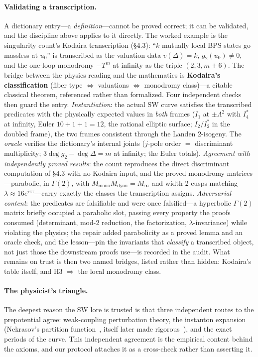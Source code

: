 \documentclass{article}
\theoremstyle{plain}
\theoremstyle{definition}
\numberwithin{equation}{section}
\begin{document}
\paragraph{Validating a transcription.} A dictionary entry---a \emph{definition}---cannot
be proved correct; it can be validated, and the discipline above applies to it directly. The
worked example is the singularity count's Kodaira transcription (\S4.3): ``$k$ mutually local
BPS states go massless at $u_0$'' is transcribed as the valuation data
$v(\Delta) = k$, $g_2(u_0) \neq 0$, and the one-loop monodromy $-T^m$ at infinity as the
triple $(2, 3, m{+}6)$. The bridge between the physics reading and the mathematics is
\textbf{Kodaira's classification} (fiber type $\Leftrightarrow$ valuations
$\Leftrightarrow$ monodromy class)---a citable classical theorem, referenced rather than
formalized. Four independent checks then guard the entry. \emph{Instantiation}: the actual SW
curve satisfies the transcribed predicates with the physically expected values in \emph{both}
frames ($I_1$ at $\pm\Lambda^2$ with $I_4^*$ at infinity, Euler $10{+}1{+}1 = 12$, the
rational elliptic surface; $I_2$/$I_2^*$ in the doubled frame), the two frames consistent
through the Landen 2-isogeny. The \emph{oracle} verifies the dictionary's internal joints
($j$-pole order $=$ discriminant multiplicity; $3\deg g_2 - \deg\Delta = m$ at infinity;
the Euler totals). \emph{Agreement with independently proved results}: the count reproduces
the direct discriminant computation of \S4.3 with no Kodaira input, and the proved monodromy
matrices---parabolic, in $\Gamma(2)$, with $M_{\mathrm{mono}}M_{\mathrm{dyon}} = M_\infty$
and width-2 cusps matching $\lambda \approx 16e^{i\pi\tau}$---carry exactly the classes
the transcription assigns. \emph{Adversarial content}: the predicates are falsifiable and
were once falsified---a hyperbolic $\Gamma(2)$ matrix briefly occupied a parabolic slot,
passing every property the proofs consumed (determinant, mod-2 reduction, the factorization,
$\lambda$-invariance) while violating the physics; the repair added parabolicity as a proved
lemma and an oracle check, and the lesson---pin the invariants that \emph{classify} a
transcribed object, not just those the downstream proofs use---is recorded in the audit. What
remains on trust is then two named bridges, listed rather than hidden: Kodaira's table itself,
and H3 $\Rightarrow$ the local monodromy class.

\paragraph{The physicist's triangle.} The deepest reason the SW lore is trusted is that three
independent routes to the prepotential agree: weak-coupling perturbation theory, the instanton
expansion (Nekrasov's partition function~\cite{Nekrasov2003}, itself later made
rigorous~\cite{NekrasovOkounkov2006}), and the exact periods of
the curve. This independent agreement is the empirical content behind the axioms, and our
protocol attaches it as a cross-check rather than asserting it.
\end{document}
